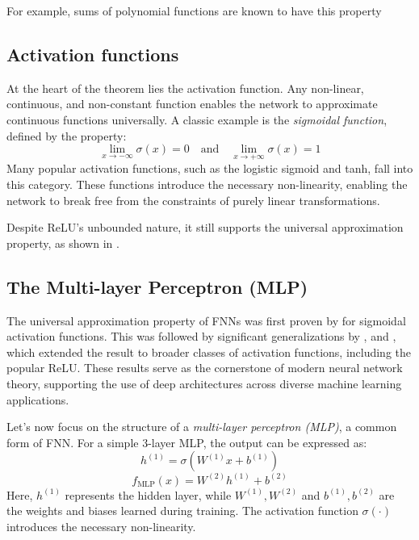 \documentclass{article}
\theoremstyle{definition}
\theoremstyle{remark}
\newcounter{ct}
\begin{document}
 For example, sums of polynomial functions are known to have this property\citep{llavona1986approximation}

\subsection{Activation functions} %
At the heart of the theorem lies the activation function. Any non-linear, continuous, and non-constant function enables the network to approximate continuous functions universally.
A classic example is the \textit{sigmoidal function}, defined by the property:
\[
\lim_{x \to -\infty} \sigma(x) = 0 \quad \text{and} \quad \lim_{x \to +\infty} \sigma(x) = 1
\]
Many popular activation functions, such as the logistic sigmoid and tanh, fall into this category.
These functions introduce the necessary non-linearity, enabling the network to break free from the constraints of purely linear transformations.

Despite ReLU's unbounded nature, it still supports the universal approximation property, as shown in \citep{yarotsky2017error}.

\citep{mhaskar2019function}

\subsection{The Multi-layer Perceptron (MLP)}

The universal approximation property of FNNs was first proven by \citep{cybenko1989approximation} for sigmoidal activation functions. This was followed by significant generalizations by \citep{hornik1989multilayer}, \citep{funahashi1989approximate} and \citep{hechtnielsen1992backpropagation}, which extended the result to broader classes of activation functions, including the popular ReLU.
These results serve as the cornerstone of modern neural network theory, supporting the use of deep architectures across diverse machine learning applications.



Let’s now focus on the structure of a \textit{multi-layer perceptron (MLP)}, a common form of FNN. For a simple 3-layer MLP, the output can be expressed as:
\[
h^{(1)} = \sigma(W^{(1)} x + b^{(1)})
\]
\[
f_{\text{MLP}}(x) = W^{(2)} h^{(1)} + b^{(2)}
\]
Here, \(h^{(1)}\) represents the hidden layer, while \(W^{(1)}, W^{(2)}\) and \(b^{(1)}, b^{(2)}\) are the weights and biases learned during training. The activation function \(\sigma(\cdot)\) introduces the necessary non-linearity.
\end{document}
